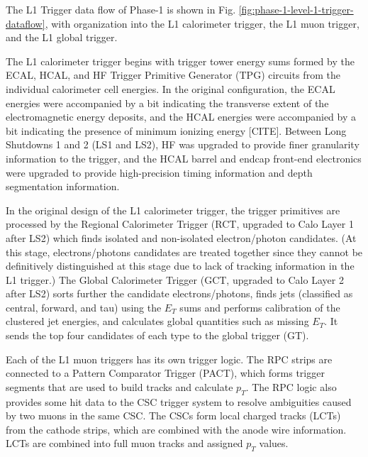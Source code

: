The L1 Trigger data flow of Phase-1 is shown in Fig. \ref{fig:phase-1-level-1-trigger-dataflow}, with organization into the L1 calorimeter trigger, the L1 muon trigger, and the L1 global trigger. 

The L1 calorimeter trigger begins with trigger tower energy sums formed by the ECAL, HCAL, and HF Trigger Primitive Generator (TPG) circuits from the individual calorimeter cell energies. In the original configuration, the ECAL energies were accompanied by a bit indicating the transverse extent of the electromagnetic energy deposits, and the HCAL energies were accompanied by a bit indicating the presence of minimum ionizing energy [CITE]. Between Long Shutdowns 1 and 2 (LS1 and LS2), HF was upgraded to provide finer granularity information to the trigger, and the HCAL barrel and endcap front-end electronics were upgraded to provide high-precision timing information and depth segmentation information. 

In the original design of the L1 calorimeter trigger, the trigger primitives are processed by the Regional Calorimeter Trigger (RCT, upgraded to Calo Layer 1 after LS2) which finds isolated and non-isolated electron/photon candidates. (At this stage, electrons/photons candidates are treated together since they cannot be definitively distinguished at this stage due to lack of tracking information in the L1 trigger.) The Global Calorimeter Trigger (GCT, upgraded to Calo Layer 2 after LS2) sorts further the candidate electrons/photons, finds jets (classified as central, forward, and tau) using the $E_T$ sums and performs calibration of the clustered jet energies, and calculates global quantities such as missing $E_T$. It sends the top four candidates of each type to the global trigger (GT).

Each of the L1 muon triggers has its own trigger logic. The RPC strips are connected to a Pattern Comparator Trigger (PACT), which forms trigger segments that are used to build tracks and calculate $p_{T}$. The RPC logic also provides some hit data to the CSC trigger system to resolve ambiguities caused by two muons in the same CSC. The CSCs form local charged tracks (LCTs) from the cathode strips, which are combined with the anode wire information. LCTs are combined into full muon tracks and assigned $p_{T}$ values. 

